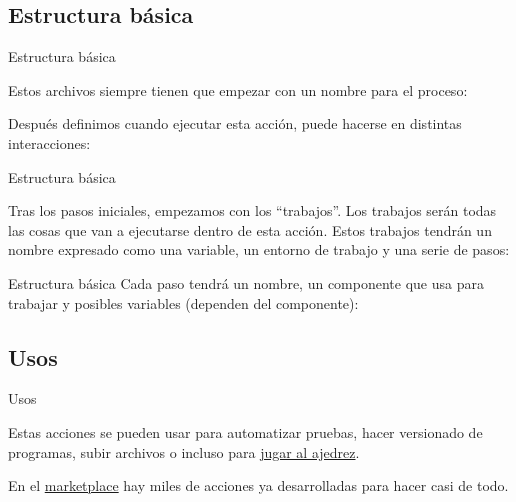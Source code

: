 \documentclass{beamer}
\begin{document}
\subsection{Estructura básica}
\begin{frame}{Estructura básica}

    Estos archivos siempre tienen que empezar con un nombre para el proceso: \\
    \begin{figure}
        
    \end{figure}

    Después definimos cuando ejecutar esta acción, puede hacerse en distintas interacciones:
    \begin{figure}
        
    \end{figure}
\end{frame}

\begin{frame}{Estructura básica}

    Tras los pasos iniciales, empezamos con los ``trabajos''. Los trabajos serán todas las cosas que van a ejecutarse dentro de esta acción.
    Estos trabajos tendrán un nombre expresado como una variable, un entorno de trabajo y una serie de pasos: \\
    \begin{figure}
        
    \end{figure}
\end{frame}
\begin{frame}{Estructura básica}
    Cada paso tendrá un nombre, un componente que usa para trabajar y posibles variables (dependen del componente):
    \begin{figure}
        
    \end{figure}
\end{frame}
\subsection{Usos}
\begin{frame}{Usos}

    Estas acciones se pueden usar para automatizar pruebas, hacer versionado de programas, subir archivos o incluso para \href{https://github.com/marcizhu/marcizhu}{jugar al ajedrez}.

    En el \href{https://github.com/marketplace?type=actions}{marketplace} hay miles de acciones ya desarrolladas para hacer casi de todo.

\end{frame}
\end{document}
